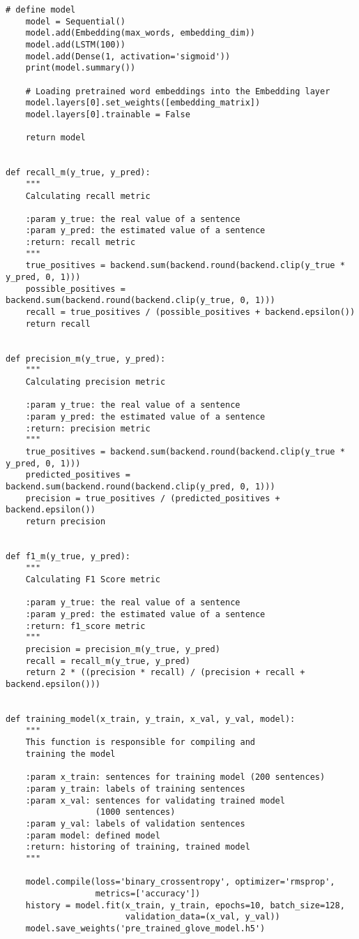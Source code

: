 \begin{lstlisting}[language=iPython]
	# define model
	model = Sequential()
	model.add(Embedding(max_words, embedding_dim))
	model.add(LSTM(100))
	model.add(Dense(1, activation='sigmoid'))
	print(model.summary())
	
	# Loading pretrained word embeddings into the Embedding layer
	model.layers[0].set_weights([embedding_matrix])
	model.layers[0].trainable = False
	
	return model
	
	
def recall_m(y_true, y_pred):
	"""
	Calculating recall metric
	
	:param y_true: the real value of a sentence
	:param y_pred: the estimated value of a sentence
	:return: recall metric
	"""
	true_positives = backend.sum(backend.round(backend.clip(y_true * y_pred, 0, 1)))
	possible_positives = backend.sum(backend.round(backend.clip(y_true, 0, 1)))
	recall = true_positives / (possible_positives + backend.epsilon())
	return recall


def precision_m(y_true, y_pred):
	"""
	Calculating precision metric
	
	:param y_true: the real value of a sentence
	:param y_pred: the estimated value of a sentence
	:return: precision metric
	"""
	true_positives = backend.sum(backend.round(backend.clip(y_true * y_pred, 0, 1)))
	predicted_positives = backend.sum(backend.round(backend.clip(y_pred, 0, 1)))
	precision = true_positives / (predicted_positives + backend.epsilon())
	return precision


def f1_m(y_true, y_pred):
	"""
	Calculating F1 Score metric
	
	:param y_true: the real value of a sentence
	:param y_pred: the estimated value of a sentence
	:return: f1_score metric
	"""
	precision = precision_m(y_true, y_pred)
	recall = recall_m(y_true, y_pred)
	return 2 * ((precision * recall) / (precision + recall + backend.epsilon()))


def training_model(x_train, y_train, x_val, y_val, model):
	"""
	This function is responsible for compiling and
	training the model
	
	:param x_train: sentences for training model (200 sentences)
	:param y_train: labels of training sentences
	:param x_val: sentences for validating trained model 
				  (1000 sentences)
	:param y_val: labels of validation sentences
	:param model: defined model
	:return: historing of training, trained model
	"""
	
	model.compile(loss='binary_crossentropy', optimizer='rmsprop',
				  metrics=['accuracy'])
	history = model.fit(x_train, y_train, epochs=10, batch_size=128,
						validation_data=(x_val, y_val))
	model.save_weights('pre_trained_glove_model.h5')
	

\end{lstlisting}
